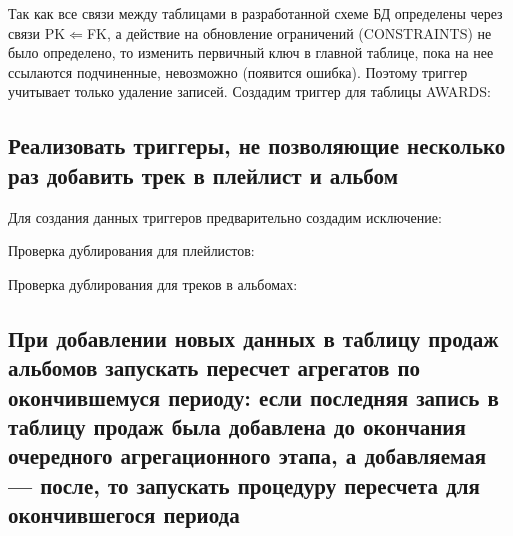 Так как все связи между таблицами в разработанной схеме БД определены через связи PK$\Leftarrow$FK, а действие на обновление ограничений (CONSTRAINTS) не было определено, то изменить первичный ключ в главной таблице, пока на нее ссылаются подчиненные, невозможно (появится ошибка). Поэтому триггер учитывает только удаление записей. Создадим триггер для таблицы AWARDS:



\subsection{Реализовать триггеры, не позволяющие несколько раз добавить трек в плейлист и альбом}

Для создания данных триггеров предварительно создадим исключение:



Проверка дублирования для плейлистов:



Проверка дублирования для треков в альбомах:



\subsection{При добавлении новых данных в таблицу продаж альбомов запускать пересчет агрегатов по окончившемуся периоду: если последняя запись в таблицу продаж была добавлена до окончания очередного агрегационного этапа, а добавляемая --- после, то запускать процедуру пересчета для окончившегося периода}

